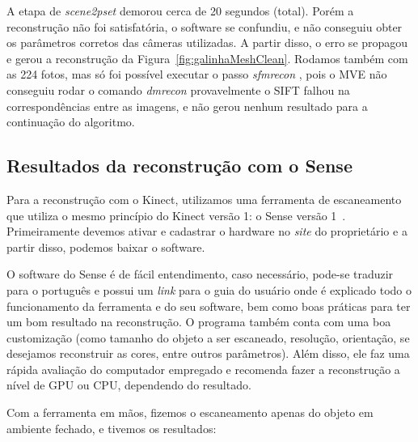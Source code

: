 A etapa de \emph{scene2pset} demorou cerca de 20 segundos (total). Porém
a reconstrução não foi satisfatória, o software se confundiu, e
não conseguiu obter os parâmetros corretos das câmeras utilizadas. A partir
disso, o erro se propagou e gerou a reconstrução da Figura~\ref{fig:galinhaMeshClean}.  Rodamos também com as 224 fotos, mas só foi possível
executar o passo \emph{sfmrecon} %
, pois o MVE não
conseguiu rodar o comando \emph{dmrecon} provavelmente o SIFT falhou na correspondências entre as imagens, e não gerou nenhum
resultado para a continuação do algoritmo.%




\subsection{Resultados da reconstrução com o Sense}
Para a reconstrução com o Kinect, utilizamos uma ferramenta de escaneamento que utiliza o mesmo princípio do Kinect versão 1: o Sense versão 1~\cite{3DSystems}.
Primeiramente devemos ativar e cadastrar o hardware no \emph{site} do proprietário e a partir disso, podemos baixar o software.

O software do Sense é de fácil entendimento, caso necessário, pode-se traduzir para o português e possui um \emph{link} para o guia do usuário onde é explicado todo o funcionamento da ferramenta e do seu software, bem como boas práticas para ter um bom resultado na reconstrução. O programa também conta com uma boa customização (como tamanho do objeto a ser escaneado, resolução, orientação, se desejamos reconstruir as cores, entre outros parâmetros). Além disso, ele faz uma rápida avaliação do computador empregado e recomenda fazer a reconstrução a nível de GPU ou CPU, dependendo do resultado.

Com a ferramenta em mãos, fizemos o escaneamento apenas do objeto em ambiente fechado, e tivemos os resultados:

